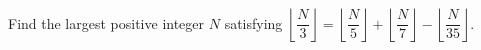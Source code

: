 Find the largest positive integer $N$ satisfying $\left\lfloor\dfrac{N}{3}\right\rfloor=\left\lfloor\dfrac{N}{5}\right\rfloor+\left\lfloor\dfrac{N}{7}\right\rfloor-\left\lfloor\dfrac{N}{35}\right\rfloor$.
